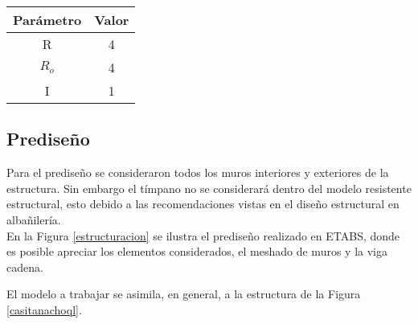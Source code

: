 \begin{table}[H]
  \centering
    \begin{tabular}{|c|c|}
    \hline
    \textbf{Parámetro} & \textbf{Valor} \bigstrut\\
    \hline
    R     & 4 \bigstrut\\
    \hline
    $R_o$ & 4 \bigstrut\\
    \hline
    I     & 1 \bigstrut\\
    \hline
    \end{tabular}%

\end{table}%

\subsection{Prediseño}

Para el prediseño se consideraron todos los muros interiores y exteriores de la estructura. Sin embargo el tímpano no se considerará dentro del modelo resistente estructural, esto debido a las recomendaciones vistas en el diseño estructural en albañilería. \\

En la Figura \ref{estructuracion} se ilustra el prediseño realizado en ETABS, donde es posible apreciar los elementos considerados, el meshado de muros y la viga cadena.


\newpage
El modelo a trabajar se asimila, en general, a la estructura de la Figura \ref{casitanachoql}.

